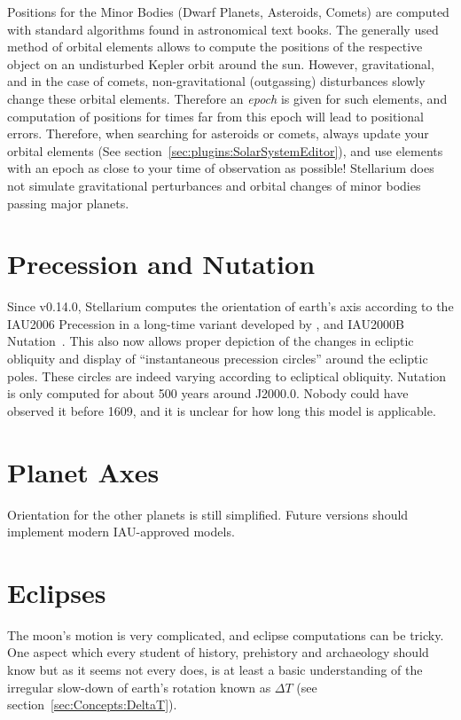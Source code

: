 Positions for the Minor Bodies (Dwarf Planets, Asteroids, Comets) are
computed with standard algorithms found in astronomical text
books. The generally used method of orbital elements allows to compute
the positions of the respective object on an undisturbed Kepler orbit
around the sun. However, gravitational, and in the case of comets,
non-gravitational (outgassing) disturbances slowly change these
orbital elements. Therefore an \emph{epoch} is given for such
elements, and computation of positions for times far from this epoch
will lead to positional errors. Therefore, when searching for
asteroids or comets, always update your orbital elements (See section~\ref{sec:plugins:SolarSystemEditor}), 
and use elements with an epoch as close to your time of observation as
possible! Stellarium does not simulate gravitational perturbances and
orbital changes of minor bodies passing major planets.

\section{Precession and Nutation}
\label{sec:Accuracy:Precession}

Since v0.14.0, Stellarium computes the orientation of earth's axis
according to the IAU2006 Precession in a long-time variant developed
by \citet{2011AA:Vondrak}, and IAU2000B Nutation~\citep{Nutation:IAU2000B}.
This also now allows proper depiction of the changes in ecliptic obliquity
and display of ``instantaneous precession circles'' around the
ecliptic poles. These circles are indeed varying according to
ecliptical obliquity. Nutation is only computed for about 500 years
around J2000.0. Nobody could have observed it before 1609, and it is
unclear for how long this model is applicable.

\section{Planet Axes}
\label{sec:Accuracy:PlanetAxes}

Orientation for the other planets is still simplified. Future versions
should implement modern IAU-approved models. 

\section{Eclipses}
\label{sec:Accuracy:Eclipses}

The moon's motion is very complicated, and eclipse computations can be tricky. 
One aspect which every student of history, prehistory and archaeology should 
know but as it seems not every does, is at least a basic understanding of the 
irregular slow-down of earth's rotation known as $\Delta T$ (see section~\ref{sec:Concepts:DeltaT}). 

